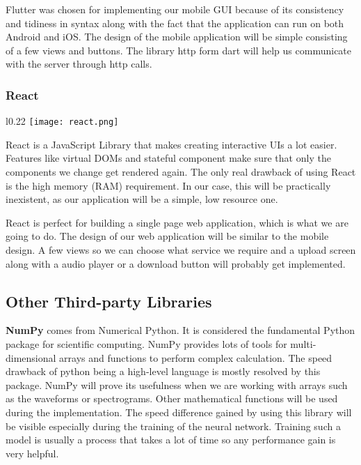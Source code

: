 \documentclass[../Thesis.tex]{subfiles}
\begin{document}
Flutter was chosen for implementing our mobile GUI because of its consistency and tidiness in syntax along with the fact that the application can run on both Android and iOS. The design of the mobile application will be simple consisting of a few views and buttons. The library http form dart will help us communicate with the server through http calls.


\subsubsection {React}

\begin{wrapfigure}{l}{0.22\textwidth}
\label {fig: react}
\texttt{[image: react.png]}
\end{wrapfigure}
React is a JavaScript Library that makes creating interactive UIs a lot easier. Features like virtual DOMs and stateful component make sure that only the components we change get rendered again. The only real drawback of using React is the high memory (RAM) requirement. In our case, this will be practically inexistent, as our application will be a simple, low resource one. 

React is perfect for building a single page web application, which is what we are going to do.
The design of our web application will be similar to the mobile design. A few views so we can choose what service we require and a upload screen along with a audio player or a download button will probably get implemented.

\subsection {Other Third-party Libraries}

\textbf{NumPy} comes from Numerical Python. It is considered the fundamental Python package for scientific computing. NumPy provides lots of tools for multi-dimensional arrays and functions to perform complex calculation. The speed drawback of python being a high-level language is mostly resolved by this package.
NumPy will prove its usefulness when we are working with arrays such as the waveforms or spectrograms. Other mathematical functions will be used during the implementation.  The speed difference gained by using this library will be visible especially during the training of the neural network. Training such a model is usually a process that takes a lot of time so any performance gain is very helpful. 
\end{document}
